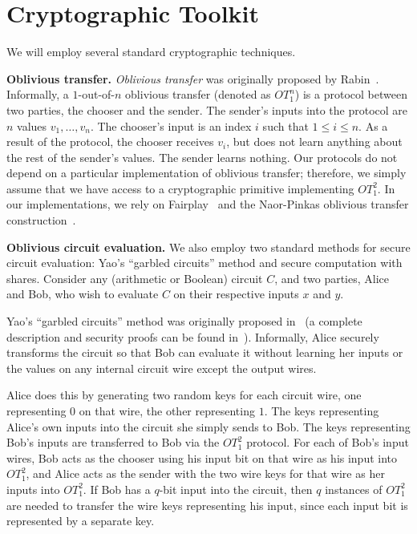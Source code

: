 \section{Cryptographic Toolkit}
\label{crypto}

We will employ several standard cryptographic techniques.

\vspace{1ex}
\noindent
\textbf{Oblivious transfer.}
\emph{Oblivious transfer} was originally proposed by Rabin~\cite{R81}.
Informally, a $1$-out-of-$n$ oblivious transfer (denoted as $OT_1^n$)
is a protocol between two parties, the chooser and the sender.
The sender's inputs into the protocol are $n$ values $v_1,\ldots,v_n$.
The chooser's input is an index $i$ such that $1 \leq i \leq n$.
As a result of the protocol, the chooser receives $v_i$, but does not
learn anything about the rest of the sender's values.  The sender learns
nothing.  Our protocols do not depend on a particular implementation of
oblivious transfer; therefore, we simply assume that we have access to a
cryptographic primitive implementing $OT_1^2$.  In our implementations,
we rely on Fairplay~\cite{Fairplay} and the Naor-Pinkas oblivious transfer
construction~\cite{Naor-Pinkas:2001}.

\vspace{1ex}
\noindent
\textbf{Oblivious circuit evaluation.}
\label{yao}
We also employ two standard methods for secure circuit evaluation: Yao's
``garbled circuits'' method and secure computation with shares.  Consider
any (arithmetic or Boolean) circuit $C$, and two parties, Alice and Bob,
who wish to evaluate $C$ on their respective inputs $x$ and $y$.  

Yao's ``garbled circuits'' method was originally proposed in~\cite{Yao86}
(a complete description and security proofs can be found in~\cite{LP04}).
Informally, Alice securely transforms the circuit so that Bob can
evaluate it without learning her inputs or the values on any internal
circuit wire except the output wires.

Alice does this by generating two random keys for each circuit wire,
one representing $0$ on that wire, the other representing $1$.  The keys
representing Alice's own inputs into the circuit she simply sends to
Bob.  The keys representing Bob's inputs are transferred to Bob via the
$OT_1^2$ protocol.  For each of Bob's input wires, Bob acts as the chooser
using his input bit on that wire as his input into $OT_1^2$, and Alice
acts as the sender with the two wire keys for that wire as her inputs
into $OT_1^2$.  If Bob has a $q$-bit input into the circuit, then $q$
instances of $OT_1^2$ are needed to transfer the wire keys representing
his input, since each input bit is represented by a separate key.

